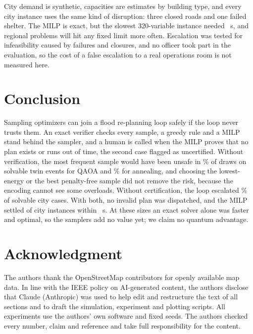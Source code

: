 \documentclass[conference]{IEEEtran}
\begin{document}
City demand is synthetic, capacities are estimates by building type, and every city instance uses the same kind of disruption: three closed roads and one failed shelter. The MILP is exact, but the slowest 320-variable instance needed \MilpSlowS~s, and regional problems will hit any fixed limit more often. Escalation was tested for infeasibility caused by failures and closures, and no officer took part in the evaluation, so the cost of a false escalation to a real operations room is not measured here.

\section{Conclusion}
Sampling optimizers can join a flood re-planning loop safely if the loop never trusts them. An exact verifier checks every sample, a greedy rule and a MILP stand behind the sampler, and a human is called when the MILP proves that no plan exists or runs out of time, the second case flagged as uncertified. Without verification, the most frequent sample would have been unsafe in \TwinRawFeasQ\% of draws on solvable twin events for QAOA and \TwinRawFeasSA\% for annealing, and choosing the lowest-energy or the best penalty-free sample did not remove the risk, because the encoding cannot see some overloads. Without certification, the loop escalated \CityFalseEsc\% of solvable city cases. With both, no invalid plan was dispatched, and the MILP settled \CitySettled{} of \CityN{} city instances within \MilpMaxS~s. At these sizes an exact solver alone was faster and optimal, so the samplers add no value yet; we claim no quantum advantage.

\section*{Acknowledgment}
The authors thank the OpenStreetMap contributors for openly available map data.
In line with the IEEE policy on AI-generated content, the authors disclose that Claude (Anthropic) was used to help edit and restructure the text of all sections and to draft the simulation, experiment and plotting scripts. All experiments use the authors' own software and fixed seeds. The authors checked every number, claim and reference and take full responsibility for the content.
\end{document}
